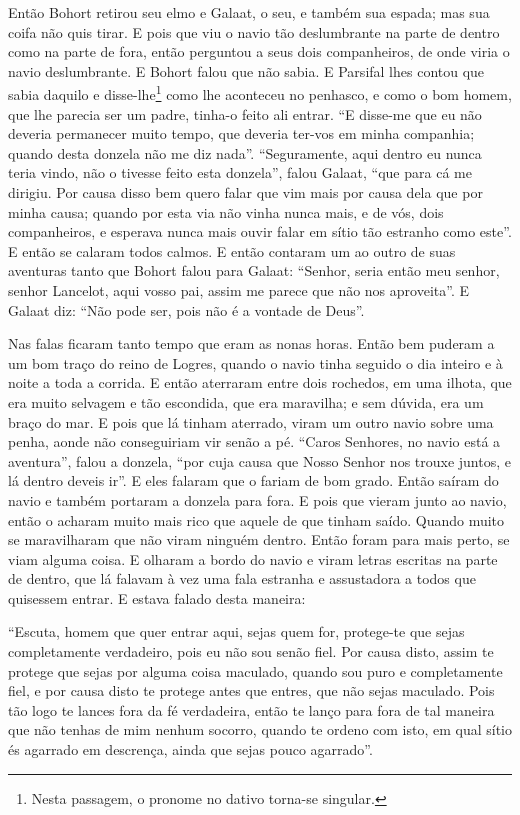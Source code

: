 Então Bohort retirou seu elmo e Galaat, o seu, e também sua espada; mas sua
coifa não quis tirar. E pois que viu o navio tão deslumbrante na parte de
dentro como na parte de fora, então perguntou a seus dois companheiros, de onde
viria o navio deslumbrante. E Bohort falou que não sabia. E Parsifal lhes
contou que sabia daquilo e disse-lhe\footnote{ Nesta passagem, o pronome no
dativo  torna-se singular.}  como lhe aconteceu no
penhasco, e como o bom homem, que lhe parecia ser um padre, tinha-o feito ali
entrar. “E disse-me que eu não deveria permanecer muito tempo, que deveria
ter-vos em minha companhia; quando desta donzela não me diz nada”.
“Seguramente, aqui dentro eu nunca teria vindo, não o tivesse feito esta
donzela”, falou Galaat, “que para cá me dirigiu. Por causa disso bem quero
falar que vim mais por causa dela que por minha causa; quando por esta via não
vinha nunca mais, e de vós, dois companheiros, e esperava nunca mais ouvir
falar em sítio tão estranho como este”. E então se calaram todos calmos. E
então contaram um ao outro de suas aventuras tanto que Bohort falou para
Galaat: “Senhor, seria então meu senhor, senhor Lancelot, aqui vosso pai,
assim me parece que não nos aproveita”. E Galaat diz: “Não pode ser, pois não é
a vontade de Deus”. 

Nas falas ficaram tanto tempo que eram as nonas horas. Então bem puderam a um
bom traço do reino de Logres, quando o navio tinha seguido o dia inteiro e à
noite a toda a corrida. E então aterraram entre dois rochedos, em uma ilhota,
que era muito selvagem e tão escondida, que era maravilha; e sem dúvida, era um
braço do mar. E pois que lá tinham aterrado, viram um outro navio sobre uma
penha, aonde não conseguiriam vir senão a pé. “Caros Senhores, no navio está a
aventura”, falou a donzela, “por cuja causa que Nosso Senhor nos trouxe juntos,
e lá dentro deveis ir”. E eles falaram que o fariam de bom grado. Então saíram
do navio e também portaram a donzela para fora. E pois que vieram junto ao
navio, então o acharam muito mais rico que aquele de que tinham saído. Quando
muito se maravilharam que não viram ninguém dentro. Então foram para mais
perto, se viam alguma coisa. E olharam a bordo do navio e viram letras escritas
na parte de dentro, que lá falavam à vez uma fala estranha e assustadora a
todos que quisessem entrar. E estava falado desta maneira:

“Escuta, homem que quer entrar aqui, sejas quem for, protege-te que sejas
completamente verdadeiro, pois eu não sou senão fiel. Por causa disto, assim te
protege que sejas por alguma coisa maculado, quando sou puro e completamente
fiel, e por causa disto te protege antes que entres, que não sejas maculado.
Pois tão logo te lances fora da fé verdadeira, então te lanço para fora de tal
maneira que não tenhas de mim nenhum socorro, quando te ordeno com isto, em
qual sítio és agarrado em descrença, ainda que sejas pouco agarrado”.


